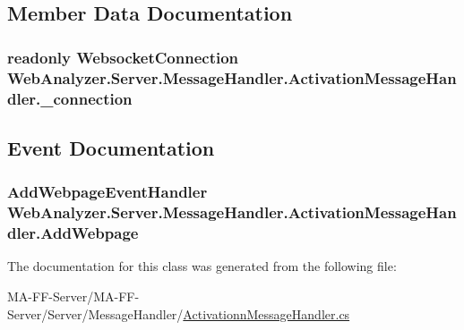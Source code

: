 \subsection{Member Data Documentation}
\hypertarget{class_web_analyzer_1_1_server_1_1_message_handler_1_1_activation_message_handler_a72e20f23d13fafc255e8e860bfe8f8fa}{}
\subsubsection[{\+\_\+connection}]{\setlength{\rightskip}{0pt plus 5cm}readonly {\bf Websocket\+Connection} Web\+Analyzer.\+Server.\+Message\+Handler.\+Activation\+Message\+Handler.\+\_\+connection\hspace{0.3cm}{\ttfamily [private]}}\label{class_web_analyzer_1_1_server_1_1_message_handler_1_1_activation_message_handler_a72e20f23d13fafc255e8e860bfe8f8fa}


\subsection{Event Documentation}
\hypertarget{class_web_analyzer_1_1_server_1_1_message_handler_1_1_activation_message_handler_aeab84864e057b34b024a8b8a11f3e135}{}
\subsubsection[{Add\+Webpage}]{\setlength{\rightskip}{0pt plus 5cm}Add\+Webpage\+Event\+Handler Web\+Analyzer.\+Server.\+Message\+Handler.\+Activation\+Message\+Handler.\+Add\+Webpage}\label{class_web_analyzer_1_1_server_1_1_message_handler_1_1_activation_message_handler_aeab84864e057b34b024a8b8a11f3e135}


The documentation for this class was generated from the following file\+:\begin{DoxyCompactItemize}
\item 
M\+A-\/\+F\+F-\/\+Server/\+M\+A-\/\+F\+F-\/\+Server/\+Server/\+Message\+Handler/\hyperlink{_activationn_message_handler_8cs}{Activationn\+Message\+Handler.\+cs}\end{DoxyCompactItemize}
